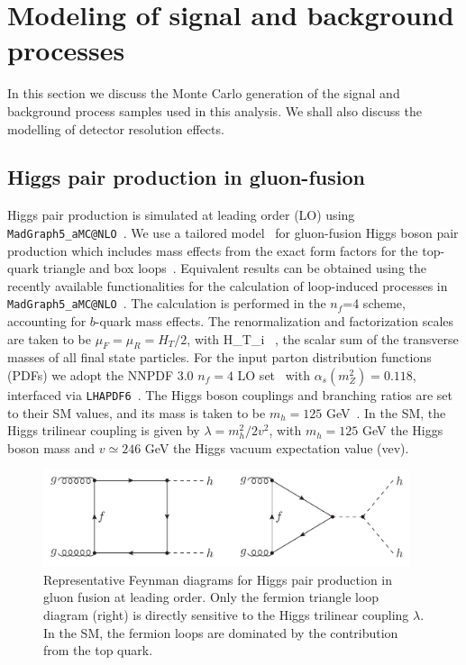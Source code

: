 

\section{Modeling of signal and background processes}
\label{mcgeneration}

In this section we discuss the Monte Carlo generation of the signal and background
process samples used in this analysis.
%
We shall also discuss the modelling of detector
resolution effects.

\subsection{Higgs pair production in gluon-fusion}



Higgs pair production is simulated at leading order (LO) using
{\tt MadGraph5\_aMC@NLO}~\cite{Alwall:2014hca}.
%
We use a tailored  model~\cite{Maltoni:2014eza}
for gluon-fusion Higgs boson pair production
which includes mass effects
from the
exact form factors for the top-quark triangle and box
loops~\cite{Plehn:1996wb}.
%
Equivalent results can be obtained using
the recently available functionalities
for the calculation of loop-induced processes
in {\tt MadGraph5\_aMC@NLO}~\cite{Hirschi:2015iia}.
%
The calculation is performed in the
$n_f$=4 scheme,  accounting for  $b$-quark mass effects. 
The renormalization and factorization
scales are taken to be $\mu_F=\mu_R=H_T/2$,
with
\be
H_T\equiv \sum_i  \, ,
\ee
the scalar sum of the
transverse masses of all final state particles.
%
For the input parton distribution functions (PDFs) we 
adopt the NNPDF 3.0 $n_f = 4$ LO set~\cite{Ball:2014uwa} with
$\alpha_s(m_Z^2)=0.118$,
interfaced via {\tt LHAPDF6}~\cite{Buckley:2014ana}.
%
The Higgs boson couplings
and branching ratios are set to their SM values,
and its mass is taken to be
$m_h=125$ GeV~\cite{Aad:2014aba,Khachatryan:2014jba,Aad:2015zhl}.
%
In the SM, the Higgs trilinear coupling
is given by $\lambda=m_h^2/2v^2$, with $m_h=125$ GeV
the Higgs boson mass and $v\simeq 246$ GeV the Higgs vacuum expectation
value (vev).
%


\begin{figure}[t]
\begin{center}
  \includegraphics[width=0.96\textwidth]{plots/hhFeyn.pdf}
  \caption{\small Representative Feynman diagrams
    for Higgs pair production in gluon fusion at
    leading order.
    Only the fermion triangle loop diagram (right) is
    directly sensitive to the Higgs trilinear coupling
    $\lambda$.
    In the SM, the fermion loops are dominated by the
    contribution from the top quark.
}
\label{fig:hhFeyn}
\end{center}
\end{figure}


